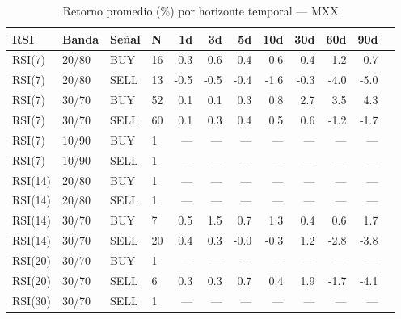 %
\begin{table}[htbp]
    \centering
    \caption{Retorno promedio (\%) por horizonte temporal --- MXX}
    \label{tab:media_mxx}
    \small
    \begin{tabular}{llllrrrrrrrr}
        \toprule
        \textbf{RSI} & \textbf{Banda} & \textbf{Se\~{n}al} & \textbf{N} & \textbf{1d} & \textbf{3d} & \textbf{5d} & \textbf{10d} & \textbf{30d} & \textbf{60d} & \textbf{90d} \\
        \midrule
        RSI(7) & 20/80 & BUY & 16 & 0.3 & 0.6 & 0.4 & 0.6 & 0.4 & 1.2 & 0.7 \\
        RSI(7) & 20/80 & SELL & 13 & -0.5 & -0.5 & -0.4 & -1.6 & -0.3 & -4.0 & -5.0 \\
        RSI(7) & 30/70 & BUY & 52 & 0.1 & 0.1 & 0.3 & 0.8 & 2.7 & 3.5 & 4.3 \\
        RSI(7) & 30/70 & SELL & 60 & 0.1 & 0.3 & 0.4 & 0.5 & 0.6 & -1.2 & -1.7 \\
        RSI(7) & 10/90 & BUY & 1 & --- & --- & --- & --- & --- & --- & --- \\
        RSI(7) & 10/90 & SELL & 1 & --- & --- & --- & --- & --- & --- & --- \\
        \midrule
        RSI(14) & 20/80 & BUY & 1 & --- & --- & --- & --- & --- & --- & --- \\
        RSI(14) & 20/80 & SELL & 1 & --- & --- & --- & --- & --- & --- & --- \\
        RSI(14) & 30/70 & BUY & 7 & 0.5 & 1.5 & 0.7 & 1.3 & 0.4 & 0.6 & 1.7 \\
        RSI(14) & 30/70 & SELL & 20 & 0.4 & 0.3 & -0.0 & -0.3 & 1.2 & -2.8 & -3.8 \\
        \midrule
        RSI(20) & 30/70 & BUY & 1 & --- & --- & --- & --- & --- & --- & --- \\
        RSI(20) & 30/70 & SELL & 6 & 0.3 & 0.3 & 0.7 & 0.4 & 1.9 & -1.7 & -4.1 \\
        \midrule
        RSI(30) & 30/70 & SELL & 1 & --- & --- & --- & --- & --- & --- & --- \\
        \bottomrule
    \end{tabular}
\end{table}
